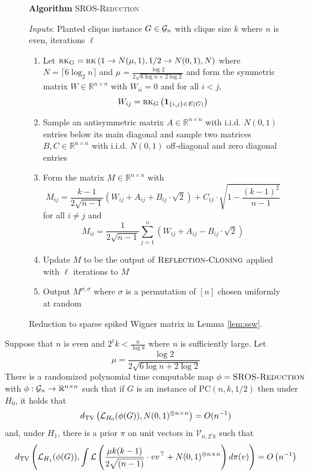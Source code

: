 \begin{figure}[t!]
\begin{algbox}
\textbf{Algorithm} \textsc{SROS-Reduction}

\vspace{2mm}

\textit{Inputs}: Planted clique instance $G \in \mathcal{G}_n$ with clique size $k$ where $n$ is even, iterations $\ell$
\begin{enumerate}
\item Let $\textsc{rk}_{\text{G}} = \textsc{rk}\left( 1 \to N(\mu, 1), 1/2 \to N(0, 1), N \right)$ where $N = \lceil 6 \log_2 n \rceil$ and $\mu = \frac{\log 2}{2 \sqrt{6 \log n + 2\log 2}}$ and form the symmetric matrix $W \in \mathbb{R}^{n \times n}$ with $W_{ii} = 0$ and for all $i < j$,
$$W_{ij} = \textsc{rk}_G\left( \mathbf{1}_{\{i, j\} \in E(G)}\right)$$
\item Sample an antisymmetric matrix $A \in \mathbb{R}^{n \times n}$ with i.i.d. $N(0, 1)$ entries below its main diagonal and sample two matrices $B, C \in \mathbb{R}^{n \times n}$ with i.i.d. $N(0, 1)$ off-diagonal and zero diagonal entries
\item Form the matrix $M \in \mathbb{R}^{n \times n}$ with
$$M_{ij} = \frac{k - 1}{2 \sqrt{n - 1}} \left( W_{ij} + A_{ij} + B_{ij} \cdot \sqrt{2} \right) + C_{ij} \cdot \sqrt{1 - \frac{(k-1)^2}{n - 1}}$$
for all $i \neq j$ and
$$M_{ii} = \frac{1}{2\sqrt{n - 1}} \sum_{j = 1}^n \left( W_{ij} + A_{ij} - B_{ij} \cdot \sqrt{2} \right)$$
\item Update $M$ to be the output of $\textsc{Reflection-Cloning}$ applied with $\ell$ iterations to $M$
\item Output $M^{\sigma, \sigma}$ where $\sigma$ is a permutation of $[n]$ chosen uniformly at random
\end{enumerate}
\vspace{1mm}
\end{algbox}
\caption{Reduction to sparse spiked Wigner matrix in Lemma \ref{lem:ssw}.}
\label{fig:ssw}
\end{figure}

\begin{lemma} \label{lem:ssw}
Suppose that $n$ is even and $2^{\ell} k < \frac{n}{\log k}$ where $n$ is sufficiently large. Let
$$\mu = \frac{\log 2}{2 \sqrt{6 \log n + 2\log 2}}$$
There is a randomized polynomial time computable map $\phi = \textsc{SROS-Reduction}$ with $\phi : \mathcal{G}_n \to \mathbb{R}^{n \times n}$ such that if $G$ is an instance of $\text{PC}(n, k, 1/2)$ then under $H_0$, it holds that
$$d_{\text{TV}}\left( \mathcal{L}_{H_0}(\phi(G)), N(0, 1)^{\otimes n \times n} \right) = O( n^{-1} )$$
and, under $H_1$, there is a prior $\pi$ on unit vectors in $\mathcal{V}_{n, 2^\ell k}$ such that
$$d_{\text{TV}}\left( \mathcal{L}_{H_1}(\phi(G)), \int \mathcal{L}\left( \frac{\mu k(k-1)}{2\sqrt{(n-1)}} \cdot  vv^\top + N(0, 1)^{\otimes n \times n} \right) d\pi(v) \right) = O\left( n^{-1} \right)$$
\end{lemma}

